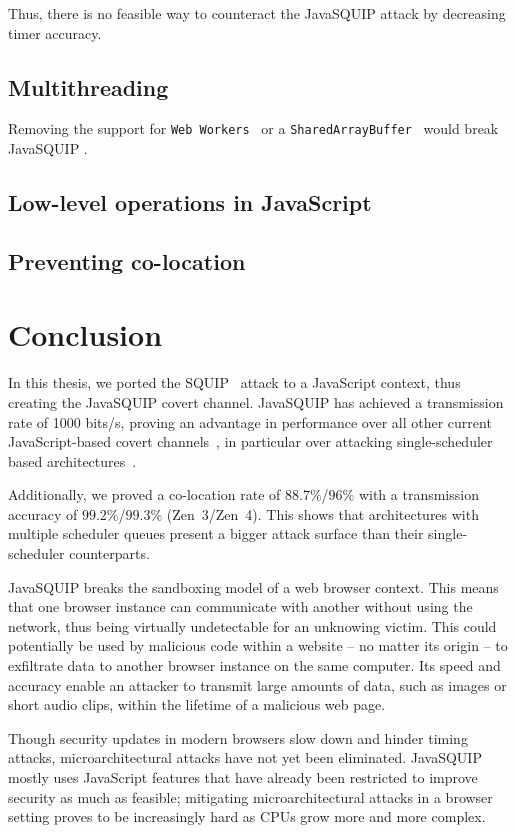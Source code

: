 \documentclass[11pt,
  titlepage=false,
]{scrreprt}
\begin{document}
Thus, there is no feasible way to counteract the JavaSQUIP attack by decreasing timer accuracy.

\section{Multithreading}
Removing the support for \texttt{Web Workers}~\cite{webworkers} or a \texttt{SharedArrayBuffer}~\cite{sharedarraybuffer}
would break JavaSQUIP .


\section{Low-level operations in JavaScript}

\section{Preventing co-location}

\pagebreak
\chapter{Conclusion}
\label{ch:conclusion}
In this thesis, we ported the SQUIP~\cite{squip} attack to a JavaScript context, thus creating the JavaSQUIP covert channel.
JavaSQUIP has achieved a transmission rate of 1000 bits/s, proving an advantage in performance over
all other current JavaScript-based covert channels~\cite{vila2017loophole, lipp2017practical},
in particular over attacking single-scheduler based architectures~\cite{Rokicki2022webport}.

Additionally, we proved a co-location rate of $88.7\%$/$96\%$ with a transmission accuracy of $99.2\%$/$99.3\%$ (Zen~3/Zen~4).
This shows that architectures with multiple scheduler queues present a bigger attack surface than their single-scheduler counterparts.

JavaSQUIP breaks the sandboxing model of a web browser context.
This means that one browser instance can communicate with another without using the network, thus being virtually undetectable for an unknowing victim.
This could potentially be used by malicious code within a website -- no matter its origin -- to exfiltrate data to another browser instance on the same computer.
Its speed and accuracy enable an attacker to transmit large amounts of data, such as images or short audio clips, within the lifetime of a malicious web page.

Though security updates in modern browsers slow down and hinder timing attacks, microarchitectural attacks have not yet been eliminated.
JavaSQUIP mostly uses JavaScript features that have already been restricted to improve security as much as feasible;
mitigating microarchitectural attacks in a browser setting proves to be increasingly hard as CPUs grow more and more complex.


\pagebreak
\printbibliography
\end{document}
